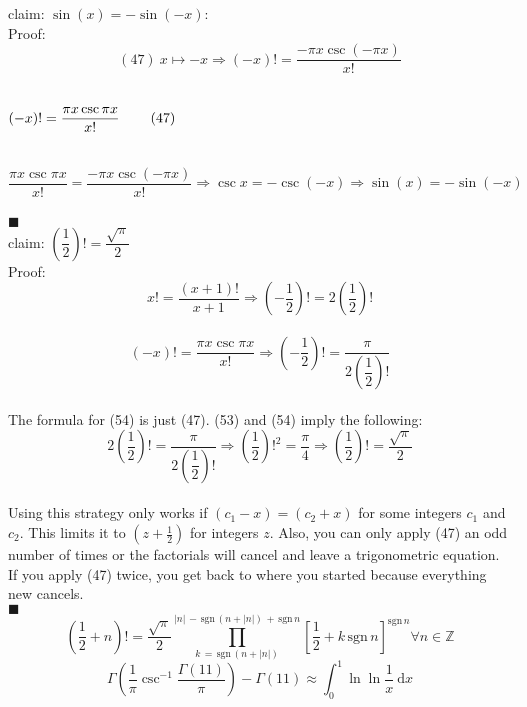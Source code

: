 \documentclass[12pt]{article}
\providecommand \dx {\mathrm dx}
\providecommand \pgrp [1] {\left( #1 \right)}   %
\providecommand \bgrp [1] {\left[ #1 \right]}   %
\providecommand \setZ {\mathbb Z}
\providecommand \abs [1] {\left| #1\right|}
\providecommand \sgn {\mathrm{sgn}\,}
\providecommand \hpx  [1] {\hspace{#1px}}
\begin{document}
\pagebreak
\noindent claim: $\sin(x) = -\sin(-x)$:\\
Proof:\\
\begin{equation}
	(47)~x \mapsto -x \Longrightarrow (-x)! = \dfrac{-\pi x\csc(-\pi x)}{x!}
\end{equation}\\ %
\centerline{$(-x)! = \dfrac{\pi x\csc\pi x}{x!}\hpx{22}(47)$}\\
\begin{equation}
	\dfrac{\pi x\csc\pi x}{x!} = \dfrac{-\pi x\csc(-\pi x)}{x!} \Longrightarrow
	\csc x = -\csc(-x) \Longrightarrow \sin(x) = -\sin(-x)
\end{equation}\\ %
$\blacksquare$\\

\noindent claim: $\pgrp{\dfrac 12}! = \dfrac{\sqrt \pi}2$\\
Proof:\\
\begin{equation}
	x! = \dfrac{(x + 1)!}{x + 1} \Longrightarrow \pgrp{-\dfrac 12}! =
	2\pgrp{\dfrac 12}!
\end{equation}\\ %
\begin{equation}
	(-x)! = \dfrac{\pi x\csc\pi x}{x!} \Longrightarrow \pgrp{-\dfrac 12}! =
	\dfrac \pi{2\pgrp{\dfrac 12}!}
\end{equation}\\ %
The formula for (54) is just (47). (53) and (54) imply the following:\\
\begin{equation}
	2\pgrp{\dfrac 12}! = \dfrac\pi{2\pgrp{\dfrac 12}!} \Longrightarrow
	\pgrp{\dfrac 12}!^2 = \dfrac \pi 4 \Longrightarrow
	\pgrp{\dfrac 12}! = \dfrac{\sqrt \pi}2
\end{equation}\\ %
Using this strategy only works if $(c_1 - x) = (c_2 + x)$ for some integers $c_1$
and $c_2$. This limits it to $(z + \frac 12)$ for integers $z$. Also, you can only
apply (47) an odd number of times or the factorials will cancel and leave a
trigonometric equation. If you apply (47) twice, you get back to where you started
because everything new cancels.\\
$\blacksquare$\\

\begin{equation}
	\pgrp{\dfrac 12 + n}! = \dfrac{\sqrt \pi}2 \prod_{k\,=\,\sgn\!(n + \abs n)
	}^{\abs n\,-\,\sgn\!(n + \abs n)\,+\,\sgn n
	} \bgrp{\dfrac 12 + k\,\sgn n}^{\sgn n} \forall n \in \setZ
\end{equation} %
\pagebreak
\begin{equation}
	\Gamma\!\pgrp{\dfrac 1\pi\csc^{-1}\dfrac{\Gamma(11)}\pi} - \Gamma(11)\approx
	\!\int_0^1\ln\ln\dfrac1x~\dx
\end{equation} %
\end{document}
